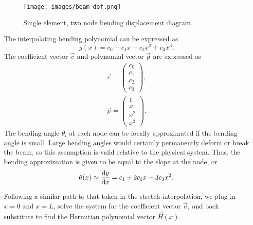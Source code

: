 \begin{figure}[ht!]
\caption{Single element, two node bending displacement diagram.}
\centering
\texttt{[image: images/beam\_dof.png]}
\label{fig:2-node-bending-dof}
\end{figure}
\noindent The interpolating bending polynomial can be expressed as 
\begin{equation}
y(x) = c_0+c_1x+c_2x^2+c_3x^3.
\label{eq:bending.poly}
\end{equation}
The coefficient vector $\vec c$ and polynomial vector $\vec p$ are expressed as
\begin{eqnarray}
\vec{c} = 
\begin{pmatrix}
c_0 \\
c_1 \\
c_2 \\
c_3
\end{pmatrix}, \\
\vec{p} = 
\begin{pmatrix}
1 \\
x \\
x^2 \\
x^3
\end{pmatrix}.
\end{eqnarray}
The bending angle $\theta_i$ at each node can be locally approximated if the bending angle is small. Large bending angles would certainly permanently deform or break the beam, so this assumption is valid relative to the physical system. Thus, the bending approximation is given to be equal to the slope at the node, or
\begin{equation}
\theta(x) \approx \frac{\text dy}{\text dx} = c_1+2c_2x+3c_3x^2.
\label{eq:bending.theta.poly}
\end{equation}

Following a similar path to that taken in the stretch interpolation, we plug in $x=0$ and $x=L$, solve the system for the coefficient vector $\vec c$, and back substitute to find the Hermitian polynomial vector $\vec H(x)$.

